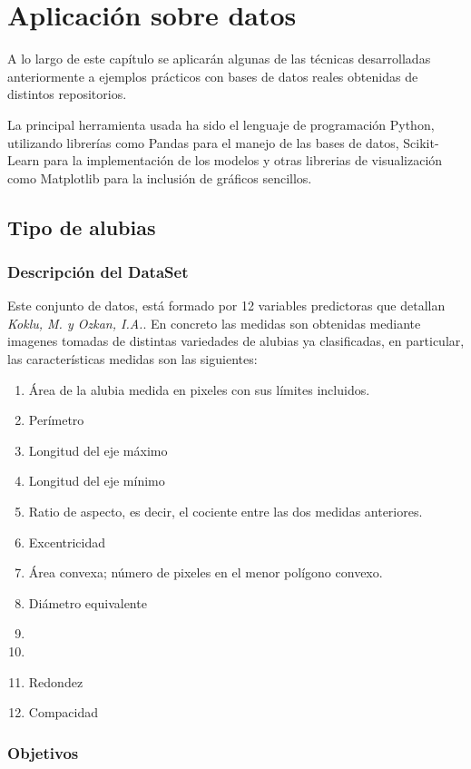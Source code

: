 \chapter{Aplicación sobre datos}

\noindent A lo largo de este capítulo se  aplicarán algunas de las técnicas desarrolladas anteriormente a ejemplos prácticos con bases de datos reales obtenidas de distintos repositorios. 

\noindent La principal herramienta usada ha sido el lenguaje de programación Python, utilizando librerías como Pandas para el manejo de las bases de datos, Scikit-Learn para la implementación de los modelos  y otras librerias de visualización como Matplotlib para la inclusión de gráficos sencillos. 

\section{Tipo de alubias}
\subsection*{Descripción del DataSet}
\noindent Este conjunto de datos,  \cite{Alubias} está formado por 12 variables predictoras que detallan \emph{Koklu, M. y Ozkan, I.A.}\cite{Koklu 2020}. En concreto las medidas son obtenidas mediante imagenes tomadas de distintas variedades de alubias ya clasificadas, en particular, las características medidas son las siguientes:
\begin{enumerate}
\item Área de la alubia medida en pixeles con sus límites incluidos.  
\item Perímetro 
\item Longitud del eje máximo
\item Longitud del eje mínimo
\item Ratio de aspecto, es decir, el cociente entre las dos medidas anteriores. 
\item Excentricidad 
\item Área convexa; número de pixeles en el menor polígono convexo. 
\item Diámetro equivalente
\item 
\item
\item Redondez
\item Compacidad
\end{enumerate}
\subsection*{Objetivos}

